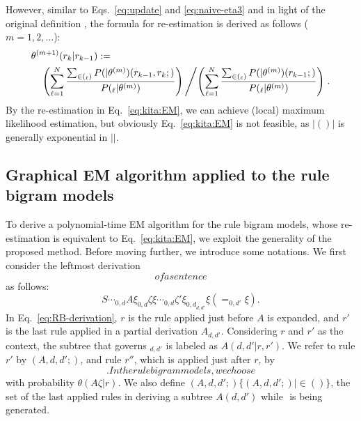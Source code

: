 \documentclass[english]{jnlp_1.4_rep}
\newcommand{\q}{}
\newcommand{\defined}{}
\newcommand{\dto}{}
\newcommand{\rderives}[1]{}
\newcommand{\derivesstar}{}
\newcommand{\win}{}
\newcommand{\rseq}{}
\newcommand{\trees}{}
\newcommand{\condrule}[3]{}
\newcommand{\lastrule}{}
\newcommand{\occ}{}
\begin{document}
However, similar to Eqs.~\ref{eq:update} and \ref{eq:naive-eta3}
and in light of the original definition \cite{Dempster77},
the formula for re-estimation is derived as follows ($m=1,2,\ldots$):
\begin{align}
 & \theta^{(m+1)}(r_k|r_{k-1}):=\nonumber\\
 & \quad \left(
		{\displaystyle
			\sum_{\ell=1}^N
			\frac{
				\sum_{\rseq\in\trees(\win_\ell)}
					P(\rseq|\theta^{(m)})\occ(r_{k-1},r_k; \rseq)
			}{P(\win_\ell|\theta^{(m)})}
		}
	\right)
	\left/
	\left(
	{\displaystyle
		\sum_{\ell=1}^N
			\frac{
				\sum_{\rseq\in\trees(\win_\ell)}
					P(\rseq|\theta^{(m)})
					\occ(r_{k-1}; \rseq)
			}{P(\win_\ell|\theta^{(m)})}
	}
	\right)
	\right..
\label{eq:kita:EM}
\end{align}
By the re-estimation in Eq.~\ref{eq:kita:EM}, we can achieve
(local) maximum likelihood estimation, but obviously
Eq.~\ref{eq:kita:EM} is not feasible,
as $|\trees(\win)|$ is generally exponential in $|\win|$.


\subsection{Graphical EM algorithm applied to the rule bigram models}
\label{sec:extensions:RB-GEM}

To derive a polynomial-time EM algorithm for the rule bigram models,
whose re-estimation is equivalent to Eq.~\ref{eq:kita:EM},
we exploit the generality of the proposed method.
Before moving further, we introduce some notations.
We first consider the leftmost derivation $\rseq$
of a sentence $\win$ as follows:
\begin{equation}
S\derivesstar\cdots\rderives{r}\win_{0,d}A\xi\rderives{r''}
	\win_{0,d}\zeta\xi\derivesstar
	\cdots\derivesstar\win_{0,d}\zeta'\xi
		\rderives{r'}\win_{0,d}\win_{d,d'}
			\xi(=\win_{0,d'}\xi)\derivesstar\win\q.
\label{eq:RB-derivation}
\end{equation}
In Eq.~\ref{eq:RB-derivation}, $r$ is the rule applied just
before $A$ is expanded, and $r'$ is the last rule applied
in a partial derivation $A\derivesstar\win_{d,d'}$.
Considering $r$ and $r'$ as the context,
the subtree that governs $\win_{d,d'}$ is labeled as $A(d,d'|r,r')$.
We refer to rule $r'$ by $\lastrule(A,d,d'; \rseq)$,
and rule $r''$, which is applied just after $r$,
by $\condrule{A}{\zeta}{r}$.  In the rule bigram models,
we choose $\condrule{A}{\zeta}{r}$ with probability
$\theta(A\dto\zeta|r)$.  We also define
$\lastrule(A,d,d'; \win)\defined
  \{\lastrule(A,d,d'; \rseq)\mid\rseq\in\trees(\win)\}$,
the set of the last applied rules in deriving
a subtree $A(d,d')$ while $\win$ is being generated.
\end{document}
